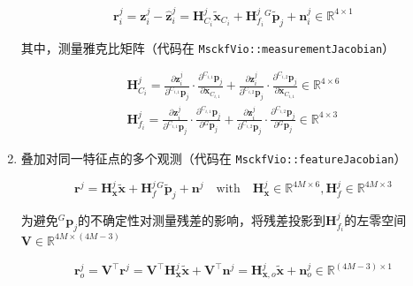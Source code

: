 \documentclass[12pt,a4paper]{article}
\begin{document}
\begin{enumerate}
\begin{equation}
\mathbf{r}^j_i = 
\mathbf{z}_i^j - \hat{\mathbf{z}}_i^j = 
\mathbf{H}_{C_i}^j\tilde{\mathbf{x}}_{C_i} + 
\mathbf{H}_{f_i}^j{}^G\tilde{\mathbf{p}}_{j} + 
\mathbf{n}_i^j
\in \mathbb{R}^{4 \times 1}
\end{equation}

其中，测量雅克比矩阵（代码在 \verb|MsckfVio::measurementJacobian|）

\begin{equation}
\begin{gathered}
\mathbf{H}_{C_i}^j = 
\frac{\partial \mathbf{z}_i^j}{\partial {}^{C_{i,1}}\mathbf{p}_j} \cdot 
\frac{\partial {}^{C_{i,1}}\mathbf{p}_j}{\partial \mathbf{x}_{C_{i,1}}} + 
\frac{\partial \mathbf{z}_i^j}{\partial {}^{C_{i,2}}\mathbf{p}_j} \cdot 
\frac{\partial {}^{C_{i,2}}\mathbf{p}_j}{\partial \mathbf{x}_{C_{i,1}}}
\in \mathbb{R}^{4 \times 6} \\
\mathbf{H}_{f_i}^j = 
\frac{\partial \mathbf{z}_i^j}{\partial {}^{C_{i,1}}\mathbf{p}_j} \cdot 
\frac{\partial {}^{C_{i,1}}\mathbf{p}_j}{\partial {}^G\mathbf{p}_j} +
\frac{\partial \mathbf{z}_i^j}{\partial {}^{C_{i,2}}\mathbf{p}_j} \cdot 
\frac{\partial {}^{C_{i,2}}\mathbf{p}_j}{\partial {}^G\mathbf{p}_j} 
\in \mathbb{R}^{4 \times 3}
\end{gathered}
\end{equation}

{\color{red}{why: Modifty the measurement Jacobian to ensure observability constrain, Ref: OC-VINS}}

\item 叠加对同一特征点的多个观测（代码在 \verb|MsckfVio::featureJacobian|）

\begin{equation*}
\mathbf{r}^j = 
\mathbf{H}_{\mathbf{x}}^j \tilde{\mathbf{x}} + 
\mathbf{H}_f^j {}^G\tilde{\mathbf{p}}_j + 
\mathbf{n}^j
\quad \text{with} \quad
\mathbf{H}_{\mathbf{x}}^j \in \mathbb{R}^{4M \times 6}, 
\mathbf{H}_f^j \in \mathbb{R}^{4M \times 3}
\end{equation*}

为避免${}^G\mathbf{p}_j$的不确定性对测量残差的影响，将残差投影到$\mathbf{H}_{f_i}^j$的左零空间 $\mathbf{V} \in \mathbb{R}^{4M \times (4M-3)}$

\begin{equation}
\mathbf{r}^j_o 
= \mathbf{V}^\top \mathbf{r}^j
= \mathbf{V}^\top \mathbf{H}_{\mathbf{x}}^j\tilde{\mathbf{x}} +
\mathbf{V}^\top \mathbf{n}^j
= \mathbf{H}_{\mathbf{x}, o}^j\tilde{\mathbf{x}} + 
\mathbf{n}^j_o 
\in \mathbb{R}^{(4M-3) \times 1}
\end{equation}


\end{enumerate}
\end{document}
